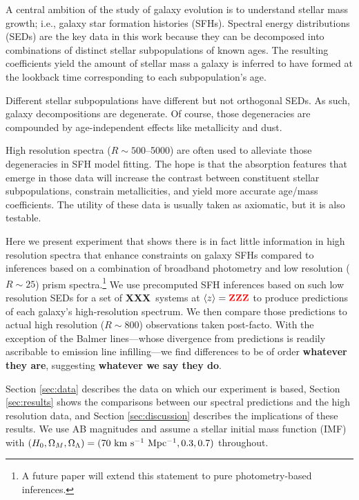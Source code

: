 \documentclass[a4paper,fleqn,usenatbib]{mnras}
\newcommand{\bfr}{\bf\color{red}}
\newcommand{\ntot}{{\bfr XXX}} %
\newcommand{\midz}{{\bfr ZZZ}} %
\begin{document}
A central ambition of the study of galaxy evolution is to understand stellar mass growth; i.e., galaxy
star formation histories (SFHs). Spectral energy distributions (SEDs) are the key data in this work because 
they can be decomposed into combinations of distinct stellar subpopulations of known ages. The resulting 
coefficients yield the amount of stellar mass a galaxy is inferred to have formed at the lookback time 
corresponding to each subpopulation's age.
	
Different stellar subpopulations have different but not orthogonal SEDs. As such, galaxy decompositions 
are degenerate. Of course, those degeneracies are compounded by age-independent effects like metallicity 
and dust. 

High resolution spectra ($R\sim500$--5000) are often used to alleviate those degeneracies in SFH model 
fitting. The hope is that the absorption features that emerge in those data will increase the contrast 
between constituent stellar subpopulations, constrain metallicities, and yield more accurate 
age/mass coefficients. The utility of these data is usually taken as axiomatic, but it is also testable. 

Here we present experiment that shows there is in fact little information in high resolution spectra
that enhance constraints on galaxy SFHs compared to inferences based on a combination of broadband 
photometry and low resolution ($R\sim25$) prism spectra.\footnote{A future paper will extend this statement 
to pure photometry-based inferences.} We use precomputed SFH inferences based on such low resolution 
SEDs for a set of \ntot\ systems at $\langle z\rangle=\midz$ to produce predictions 
of each galaxy's high-resolution spectrum. We then compare those predictions to actual high resolution 
($R\sim800$) observations taken post-facto. With the exception of the Balmer lines---whose divergence 
from predictions is readily ascribable to emission line infilling---we find differences to be of order 
{\bfr whatever they are}, suggesting {\bfr whatever we say they do}.

Section \ref{sec:data} describes the data on which our experiment is based, Section \ref{sec:results} 
shows the comparisons between our spectral predictions and the high resolution data, and Section
\ref{sec:discussion} describes the implications of these results. We use AB magnitudes and assume 
a \citet{Chabrier03} stellar initial mass function (IMF) with $(H_{0}, \Omega_{M}, \Omega_{\Lambda}) =
(70~{\rm km~s^{-1}~Mpc^{-1}}, 0.3, 0.7)$ throughout.
\end{document}
